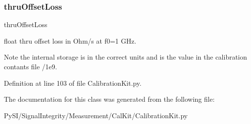 \subsubsection{\texorpdfstring{thru\+Offset\+Loss}{thruOffsetLoss}}
{\footnotesize\ttfamily thru\+Offset\+Loss}



float thru offset loss in Ohm/s at f0=1 G\+Hz. 

\begin{DoxyNote}{Note}
the internal storage is in the correct units and is the value in the calibration contants file /1e9. 
\end{DoxyNote}


Definition at line 103 of file Calibration\+Kit.\+py.



The documentation for this class was generated from the following file\+:\begin{DoxyCompactItemize}
\item 
Py\+S\+I/\+Signal\+Integrity/\+Measurement/\+Cal\+Kit/Calibration\+Kit.\+py\end{DoxyCompactItemize}

